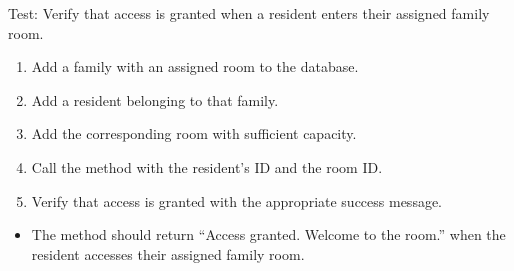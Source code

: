 \documentclass[letterpaper,10pt,english]{sphinxmanual}
\begin{document}
\begin{fulllineitems}
\label{\detokenize{test:test.test_room.test_access_room_family_room}}
\pysigstartsignatures
\pysiglinewithargsret
{}
{}
{}
\pysigstopsignatures
\sphinxAtStartPar
Test: Verify that access is granted when a resident enters their assigned family room.
\begin{description}
\begin{enumerate}
%
\item {} 
\sphinxAtStartPar
Add a family with an assigned room to the database.

\item {} 
\sphinxAtStartPar
Add a resident belonging to that family.

\item {} 
\sphinxAtStartPar
Add the corresponding room with sufficient capacity.

\item {} 
\sphinxAtStartPar
Call the  method with the resident’s ID and the room ID.

\item {} 
\sphinxAtStartPar
Verify that access is granted with the appropriate success message.

\end{enumerate}

\begin{itemize}
\item {} 
\sphinxAtStartPar
The method should return “Access granted. Welcome to the room.”
when the resident accesses their assigned family room.

\end{itemize}

\end{description}

\end{fulllineitems}

\end{document}
